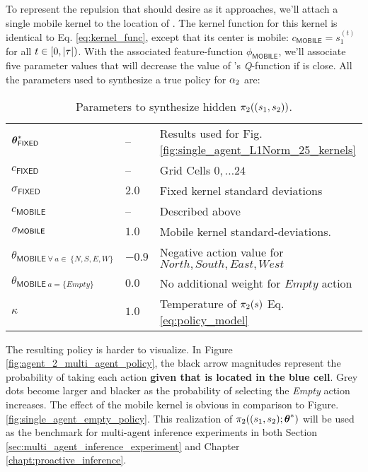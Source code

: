     To represent the repulsion that  should desire as it  approaches, we'll attach a single mobile
    kernel to the location of . The kernel function for this kernel is identical to Eq. \ref{eq:kernel_func},
    except that its center is mobile: $c_{\mathsf{MOBILE}} = s_1^{(t)}$ for all $t \in [0,|\tau|)$. With the associated
    feature-function $\phi_{\mathsf{MOBILE}}$, we'll associate five parameter values that will decrease the value of
    's \emph{Q}-function if  is close. All the parameters used to synthesize a true policy for
    $\alpha_{2}$ are:

\begin{table}[H]
    \centering
    \begin{tabular}{l|l l}
        $\boldsymbol{\mathbb{\theta}}^*_{\mathsf{FIXED}}$ & -- & Results used for Fig. \ref{fig:single_agent_L1Norm_25_kernels} \\
        $c_{\mathsf{FIXED}}$ & -- & Grid Cells $0,\ldots 24$ \\
        $\sigma_{\mathsf{FIXED}}$ & $2.0$ & Fixed kernel standard deviations\\
        $c_{\mathsf{MOBILE}}$ & -- & Described above \\
        $\sigma_{\mathsf{MOBILE}}$ & $\mathbf{1.0}$ & Mobile kernel standard-deviations.\\
        $\theta_{\mathsf{MOBILE}\ \forall\ a \in\ \{N,S,E,W\}}$ & $-0.9$  & Negative action value for ${North, South,
                                                                                                        East, West}$\\
        $\theta_{\mathsf{MOBILE}\ a = \{Empty\}}$ & $0.0$  & No additional weight for $Empty$ action \\
        $\kappa$ & $1.0$ & Temperature of $\pi_{2}(s)$ Eq.\ref{eq:policy_model} \\
    \end{tabular}
    \caption{Parameters to synthesize hidden $\pi_{2}((s_1,s_2))$.}
    \label{table:true_multi_agent_2_policy}
\end{table}

    The resulting policy is harder to visualize. In Figure \ref{fig:agent_2_multi_agent_policy}, the black arrow
    magnitudes represent the probability of  taking each action \textbf{given that  is located in the
    blue cell}. Grey dots become larger and blacker as the probability of  selecting the \emph{Empty} action
    increases. The effect of the mobile kernel is obvious in comparison to Figure.  \ref{fig:single_agent_empty_policy}.
    This realization of $\pi_{2}((s_1,s_2);\boldsymbol{\mathbb{\theta}}^*)$ will be used as the benchmark for multi-agent
    inference experiments in both Section \ref{sec:multi_agent_inference_experiment} and Chapter
    \ref{chapt:proactive_inference}.

